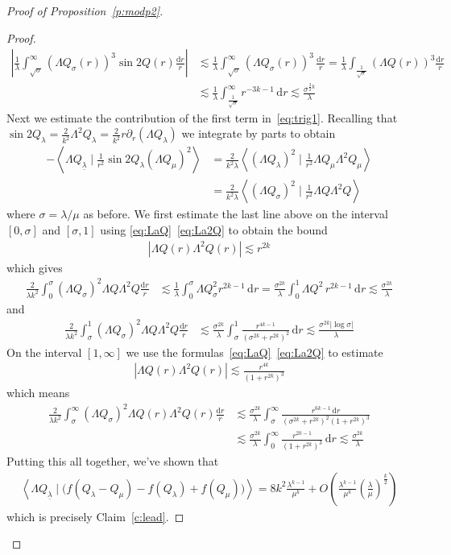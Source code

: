 \documentclass[10pt,reqno]{amsart}
\newcommand{\la}{\lambda}
\newcommand{\s}{\sigma}
\newcommand{\La}{\Lambda}
\newcommand{\p}{\partial}
\newcommand{\ang}[1]{\left\langle{#1}\right\rangle}
\newcommand{\abs}[1]{\left\lvert{#1}\right\rvert}
\newcommand{\EQ}[1]{\begin{equation}\begin{split} #1 \end{split}\end{equation}}
\numberwithin{equation}{section}
\theoremstyle{remark}
\newcounter{parts}
\newcommand{\ula}{\underline{\lambda}}
\newcommand{\ud}{\mathrm{d}}
\newcommand{\0}{\emptyset}
\begin{document}
\begin{proof}[Proof of Proposition~\ref{p:modp2}]
\begin{proof}
\EQ{
\abs{\frac{1}{\la}  \int_{\sqrt{\s}}^\infty ( \La Q_{\s}(r))^3 \sin 2 Q(r) \frac{ \ud r }{r} }&\lesssim \frac{1}{\la} \int_{\sqrt{\s}}^\infty ( \La Q_{\s}(r))^3 \, \frac{\ud r}{r}  =  \frac{1}{\la}\int_{\frac{1}{\sqrt{\s}}} ( \La Q(r))^3 \frac{ \ud r }{r} \\
&  \lesssim \frac{1}{\la}\int_{\frac{1}{\sqrt{\s}}}^{\infty} r^{-3k-1} \, \ud r \lesssim \frac{ \s^{\frac{3}{2} k}}{\la}
}
Next we estimate the contribution of the first term in~\eqref{eq:trig1}. Recalling that $\sin 2 Q_\la = \frac{2}{k^2} \La^2 Q_\la = \frac{2}{k^2} r \p_r (\La Q_{\la})$ we integrate by parts to obtain
\EQ{
-\ang{ \La Q_{\ula}  \mid\frac{1}{r^2} \sin 2 Q_\la (\La Q_\mu)^2} &= \frac{2}{k^2 \la} \ang{ (\La Q_{\la})^2 \mid \frac{1}{r^2} \La Q_{\mu} \La^2 Q_\mu } \\
& = \frac{2}{k^2 \la} \ang{ (\La Q_{\s})^2 \mid \frac{1}{r^2} \La Q \La^2 Q }
}
where $\s = \la/ \mu$ as before. We first estimate the last line above on the interval $[0, \s]$ and $[\sigma, 1]$ using \eqref{eq:LaQ}~\eqref{eq:La2Q} to obtain the bound 
\EQ{
\abs{\La Q(r)\La^2 Q(r)} \lesssim r^{2k} 
}
which gives 
\EQ{
\frac{2}{\la k^2} \int_0^\s (\La Q_{\s})^2 \La Q\La^2 Q \frac{\ud r}{r}&  \lesssim\frac{1}{\la} \int_0^\s \La Q_{\s}^2 r^{2k-1} \, \ud r = \frac{\s^{2k}}{\la} \int_0^1 \La Q^2  \, r^{2k-1} \, \ud r 
 \lesssim \frac{\s^{2k}}{\la}
}
and 
\EQ{
\frac{2}{\la k^2} \int_{\s}^1 (\La Q_{\s})^2 \La Q\La^2 Q \frac{\ud r}{r}& \lesssim \frac{\s^{2k}}{\la} \int_\s^1  \frac{r^{4k-1}}{ (\s^{2k} + r^{2k})^2} \, \ud  r \lesssim \frac{\s^{2k}\abs{\log \s}}{\la}
}
On the interval $[1, \infty]$ we use the formulas~\eqref{eq:LaQ}~\eqref{eq:La2Q} to estimate 
\EQ{
\abs{\La Q(r)\La^2 Q(r)} \lesssim \frac{r^{4k}}{(1+ r^{2k})^3}%
}
which means 
\EQ{
\frac{2}{\la k^2} \int_{\s}^\infty (\La Q_{\s})^2 \La Q(r)\La^2 Q(r) \frac{\ud r}{r}&  \lesssim \frac{\s^{2k}}{\la} \int_{\s}^\infty \frac{r^{6k-1}\,  \ud r}{ (\s^{2k}+ r^{2k})^2(1+r^{2k})^3}  \\
& \lesssim  \frac{\s^{2k}}{\la} \int_0^\infty \frac{ r^{2k-1}}{(1+r^{2k})^3} \, \ud r \lesssim \frac{\s^{2k}}{\la}
}
Putting this all together, we've shown that 
\EQ{
\ang{\La Q_{\ula} \mid  \Big( f(Q_{\la} - Q_\mu) - f(Q_\la) + f(Q_\mu) \Big)}   =  8k^2 \frac{\la^{k-1}}{\mu^k} + O\left(\frac{\la^{k-1}}{\mu^k} \left(\frac{\la}{\mu}\right)^{\frac{k}{2}} \right)
}
which is precisely Claim~\ref{c:lead}. 
\end{proof} 


\end{proof}
\end{document}
